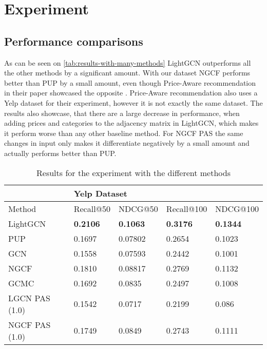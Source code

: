 \section{Experiment}


\subsection{Performance comparisons}
As can be seen on \autoref{tab:results-with-many-methods} LightGCN outperforms all the other methods by a significant amount.
With our dataset NGCF performs better than PUP by a small amount, even though Price-Aware recommendation in their paper showcased the opposite \cite{Priceaware}.
Price-Aware recommendation also uses a Yelp dataset for their experiment, however it is not exactly the same dataset.
The results also showcase, that there are a large decrease in performance, when adding prices and categories to the adjacency matrix in LightGCN, which makes it perform worse than any other baseline method.
For NGCF PAS the same changes in input only makes it differentiate negatively by a small amount and actually performs better than PUP.

\begin{table*}[h!]
    \centering
    \begin{tabular}{|l|l|l|l|l|}
        \hline
        \rowcolor[HTML]{FFFFFF}
                       & \multicolumn{4}{l|}{\cellcolor[HTML]{FFFFFF}Yelp Dataset}                                                       \\ \hline
        Method         & Recall@50                                                 & NDCG@50         & Recall@100      & NDCG@100        \\ \hline
        LightGCN       & \textbf{0.2106}                                           & \textbf{0.1063} & \textbf{0.3176} & \textbf{0.1344} \\ \hline
        PUP            & 0.1697                                                    & 0.07802         & 0.2654          & 0.1023          \\ \hline
        GCN            & 0.1558                                                    & 0.07593         & 0.2442          & 0.1001          \\ \hline
        NGCF           & 0.1810                                                    & 0.08817         & 0.2769          & 0.1132          \\ \hline
        GCMC           & 0.1692                                                    & 0.0835          & 0.2497          & 0.1008          \\ \hline
        LGCN PAS (1.0) & 0.1542                                                    & 0.0717          & 0.2199          & 0.086           \\ \hline
        NGCF PAS (1.0) & 0.1749                                                    & 0.0849          & 0.2743          & 0.1111          \\ \hline
    \end{tabular}
    \caption{Results for the experiment with the different methods}
    \label{tab:results-with-many-methods}
\end{table*}

